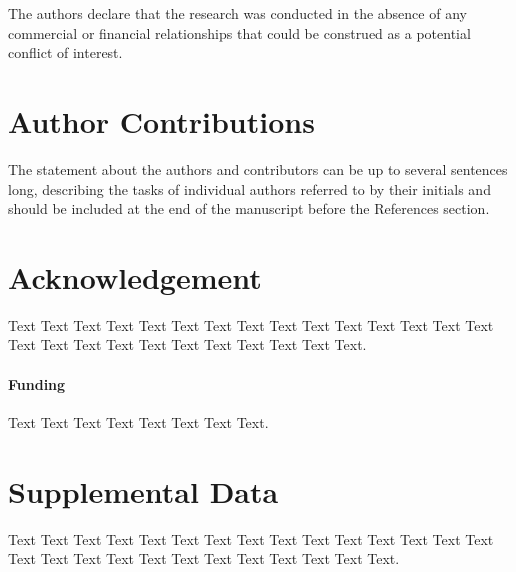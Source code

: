 \documentclass{frontiersSCNS} %
\begin{document}
The authors declare that the research was conducted in the absence of any commercial or financial relationships that could be construed as a potential conflict of interest.

\section*{Author Contributions}

The statement about the authors and contributors can be up to several sentences long, describing the tasks of individual authors referred to by their initials and should be included at the end of the manuscript before the References section.


\section*{Acknowledgement}
Text Text Text Text Text Text  Text Text Text Text Text Text Text Text  Text Text Text Text Text Text Text Text Text  Text Text Text.

\paragraph{Funding\textcolon} Text Text Text Text Text Text  Text Text.

\section*{Supplemental Data}
Text Text Text Text Text Text  Text Text Text Text Text Text Text Text Text  Text Text Text Text Text Text Text Text Text  Text Text Text.


\end{document}

